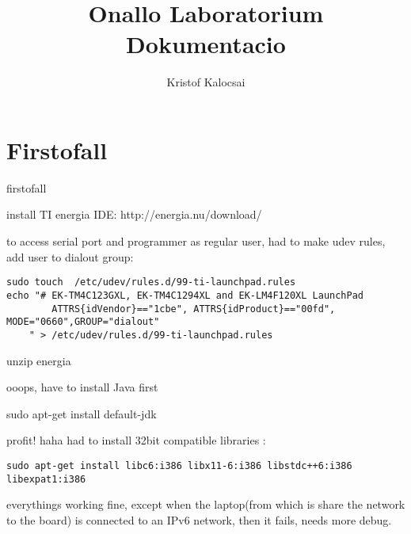 \documentclass{article}
\title{Onallo Laboratorium Dokumentacio}
\author{Kristof Kalocsai}
\begin{document}
\maketitle
\section{Firstofall}
firstofall

install TI energia IDE:  http://energia.nu/download/

to access serial port and programmer as regular user, had to make udev rules, add user to dialout group:
\begin{verbatim}
sudo touch  /etc/udev/rules.d/99-ti-launchpad.rules
echo "# EK-TM4C123GXL, EK-TM4C1294XL and EK-LM4F120XL LaunchPad
		ATTRS{idVendor}=="1cbe", ATTRS{idProduct}=="00fd", MODE="0660",GROUP="dialout"
	" > /etc/udev/rules.d/99-ti-launchpad.rules
\end{verbatim}
unzip energia

ooops, have to install Java first

sudo apt-get install default-jdk

profit!
haha
had to install 32bit compatible libraries :
\begin{verbatim}
sudo apt-get install libc6:i386 libx11-6:i386 libstdc++6:i386 libexpat1:i386
\end{verbatim}
everythings working fine, except when the laptop(from which is share the network to the board) is connected to an IPv6 network, then it fails, needs more debug.
\end{document}
